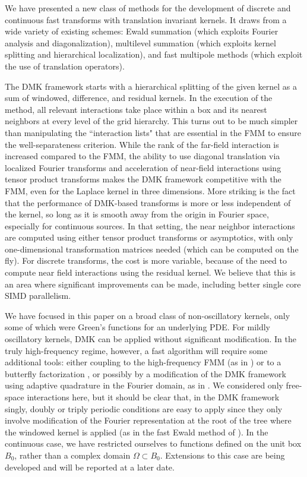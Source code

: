 \documentclass[final,letterpaper]{siamart171218}
\newcommand{\acron}{DMK }
\begin{document}
We have presented a new class of methods for the development of discrete and continuous
fast transforms with translation invariant kernels.
It draws from a wide variety of existing schemes: Ewald summation (which exploits
Fourier analysis and diagonalization), multilevel summation (which exploits
kernel splitting and hierarchical localization), and fast multipole methods (which
exploit the use of translation operators). 

The \acron framework starts with a hierarchical splitting of 
the given kernel as a sum of windowed, difference,
and residual kernels. In the execution of the method, all relevant interactions
take place within a box and its nearest neighbors at every level of the grid hierarchy.
This turns out to be much simpler than manipulating the ``interaction lists" that are
essential in the FMM to ensure the well-separateness criterion.
While the rank of the far-field
interaction is increased compared to the FMM, the ability to use
diagonal translation via localized Fourier transforms and acceleration of near-field
interactions using tensor product transforms makes the 
\acron framework competitive with the FMM, even for the Laplace kernel in
three dimensions. More striking is the fact that the performance of DMK-based
transforms is more or less independent of the kernel, so long as it is 
smooth away from the origin in Fourier space, especially for continuous sources. 
In that setting, the near neighbor interactions are computed using either
tensor product transforms or asymptotics, with only one-dimensional
transformation matrices needed (which can be computed on the fly).
For discrete transforms, the cost is more variable, because of the need to
compute near field interactions using the residual kernel. We believe that this is an 
area where significant improvements can be made, including better single core SIMD parallelism.

We have focused in this paper on a broad class of  non-oscillatory kernels, only some of
which were Green's functions for an underlying PDE.
For mildly oscillatory kernels, \acron can be applied without significant
modification. In the truly high-frequency regime, however, a fast algorithm
will require some additional tools:
either 
coupling to the high-frequency FMM (as in \cite{wideband2d,wideband3d}) 
or to a butterfly factorization \cite{butterfly_direct,li-2015,oneil-2010}, or possibly by 
a modification of the \acron framework using adaptive quadrature in the Fourier domain,
as in \cite{beylkin2009jcp}.
We considered only free-space interactions here, but it should be clear that,
in the \acron framework singly, doubly or triply periodic conditions are easy to apply 
since they only involve modification of the Fourier representation at the root of the tree
where the windowed kernel is applied (as in the fast Ewald method of \cite{shamshirgar2021jcp}).
In the continuous case, we have restricted ourselves to functions defined on the unit box $B_0$,
rather than a complex domain $\Omega \subset B_0$. Extensions to this case are being 
developed and will be reported at a later date.
\end{document}
